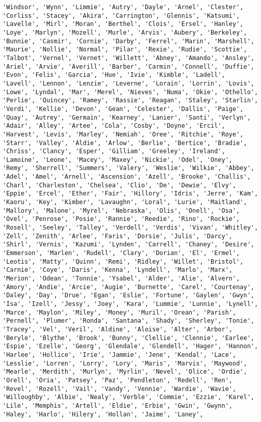 \documentclass[11pt]{article}
\begin{document}
\begin{Verbatim}[commandchars=\\\{\}]
'Windsor', 'Wynn', 'Limmie', 'Autry', 'Dayle', 'Arnel', 'Clester', 'Corliss', 'Stacey', 'Akira', 'Carrington', 'Glennis', 'Katsumi', 'Lavelle', 'Mirl', 'Moran', 'Berthel', 'Clois', 'Ersel', 'Hanley', 'Loye', 'Marlyn', 'Mozell', 'Murle', 'Arvis', 'Aubery', 'Berkeley', 'Bunnie', 'Casmir', 'Cornie', 'Darby', 'Ferrel', 'Marin', 'Marshell', 'Maurie', 'Nollie', 'Normal', 'Pilar', 'Rexie', 'Rudie', 'Scottie', 'Talbot', 'Vernel', 'Vernet', 'Willett', 'Abney', 'Amando', 'Ansley', 'Ariel', 'Arvie', 'Averill', 'Barber', 'Carmin', 'Connell', 'Duffie', 'Evon', 'Felis', 'Garcia', 'Hue', 'Ivie', 'Kimble', 'Ladell', 'Lavell', 'Lennon', 'Lenzie', 'Leverne', 'Lorain', 'Lorrin', 'Lovis', 'Lowe', 'Lyndal', 'Mar', 'Merel', 'Nieves', 'Numa', 'Okie', 'Othello', 'Perlie', 'Quincey', 'Ramey', 'Rassie', 'Reagan', 'Staley', 'Starlin', 'Verdi', 'Kellie', 'Devon', 'Gean', 'Celester', 'Dallis', 'Paige', 'Quay', 'Autrey', 'Germain', 'Kearney', 'Lanier', 'Santi', 'Verlyn', 'Adair', 'Alley', 'Artee', 'Cola', 'Cosby', 'Doyne', 'Ercil', 'Harvest', 'Levis', 'Marley', 'Nemiah', 'Oree', 'Ritchie', 'Roye', 'Starr', 'Valley', 'Aldie', 'Arlow', 'Berlie', 'Bertice', 'Bradie', 'Chriss', 'Clancy', 'Esper', 'Gilliam', 'Greeley', 'Ireland', 'Lamoine', 'Leone', 'Macey', 'Maxey', 'Nickie', 'Odel', 'Oney', 'Remy', 'Sherrell', 'Summers', 'Valery', 'Weslie', 'Wilkie', 'Abbey', 'Adel', 'Amel', 'Arnell', 'Ascension', 'Azell', 'Brooke', 'Challis', 'Charl', 'Charleston', 'Chelsea', 'Clio', 'De', 'Dewie', 'Elvy', 'Eppie', 'Ercel', 'Ether', 'Fair', 'Hillory', 'Idris', 'Jerre', 'Kam', 'Kaoru', 'Key', 'Kimber', 'Lavaughn', 'Loral', 'Lurie', 'Maitland', 'Mallory', 'Malone', 'Myrel', 'Nebraska', 'Olis', 'Onell', 'Osa', 'Ovel', 'Penrose', 'Posie', 'Rannie', 'Reedie', 'Rino', 'Rockie', 'Rosell', 'Seeley', 'Talley', 'Verdell', 'Verdis', 'Vivan', 'Whitley', 'Zell', 'Zenith', 'Arlee', 'Faris', 'Dorsie', 'Julis', 'Darcy', 'Shirl', 'Vernis', 'Kazumi', 'Lynden', 'Carrell', 'Chaney', 'Desire', 'Emmerson', 'Marlen', 'Rudell', 'Clary', 'Dorian', 'El', 'Ermel', 'Leotis', 'Matty', 'Quinn', 'Remi', 'Ridley', 'Willet', 'Bristol', 'Carnie', 'Coye', 'Daris', 'Kenna', 'Lyndell', 'Marlo', 'Marx', 'Merion', 'Odean', 'Tonnie', 'Ysabel', 'Alder', 'Alie', 'Alvern', 'Amory', 'Andie', 'Arcie', 'Augie', 'Burnette', 'Carel', 'Courtenay', 'Daley', 'Day', 'Drue', 'Egan', 'Eslie', 'Fortune', 'Gaylen', 'Gwyn', 'Isa', 'Izell', 'Jessy', 'Joey', 'Kara', 'Lummie', 'Lunnie', 'Lynell', 'Marce', 'Maylon', 'Miley', 'Money', 'Muril', 'Orean', 'Parish', 'Pernell', 'Plumer', 'Ronda', 'Santana', 'Shady', 'Sherley', 'Tonie', 'Tracey', 'Vel', 'Veril', 'Aldine', 'Aloise', 'Alter', 'Arbor', 'Beryle', 'Blythe', 'Brook', 'Bunny', 'Clellie', 'Clennie', 'Earlee', 'Espie', 'Ezelle', 'Georg', 'Glendale', 'Glendell', 'Hager', 'Hannon', 'Harlee', 'Hollice', 'Irie', 'Jammie', 'Jene', 'Kendal', 'Lace', 'Lesslie', 'Lorren', 'Lorry', 'Lory', 'Maris', 'Marvis', 'Maywood', 'Mearle', 'Merdith', 'Murlyn', 'Myrlin', 'Nevel', 'Olice', 'Ordie', 'Orell', 'Oria', 'Patsey', 'Paz', 'Pendleton', 'Redell', 'Ren', 'Revel', 'Rozell', 'Vail', 'Vandy', 'Vennie', 'Wardie', 'Wavie', 'Willoughby', 'Albie', 'Nealy', 'Verble', 'Commie', 'Ezzie', 'Karel', 'Lile', 'Memphis', 'Artell', 'Eldie', 'Erbie', 'Gwin', 'Gwynn', 'Haley', 'Harlo', 'Hilery', 'Hollan', 'Jaime', 'Laney', 
\end{Verbatim}
\end{document}
